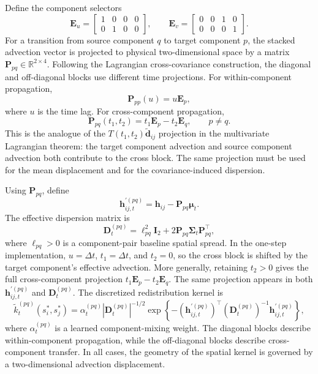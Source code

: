 Define the component selectors
\[
\mathbf E_u =
\begin{bmatrix}
1 & 0 & 0 & 0\\
0 & 1 & 0 & 0
\end{bmatrix},
\qquad
\mathbf E_v =
\begin{bmatrix}
0 & 0 & 1 & 0\\
0 & 0 & 0 & 1
\end{bmatrix}.
\]
For a transition from source component \(q\) to target component \(p\), the
stacked advection vector is projected to physical two-dimensional space by a
matrix \(\mathbf P_{pq}\in\mathbb R^{2\times4}\). Following the Lagrangian
cross-covariance construction, the diagonal and off-diagonal blocks use
different time projections. For within-component propagation,
\begin{equation}
\mathbf P_{pp}(u)=u\mathbf E_p,
\end{equation}
where \(u\) is the time lag. For cross-component propagation,
\begin{equation}
\mathbf P_{pq}(t_1,t_2)=t_1\mathbf E_p-t_2\mathbf E_q,
\qquad p\neq q .
\label{eq:component_cross_projection}
\end{equation}
This is the analogue of the \(T(t_1,t_2)\widetilde{\mathbf d}_{ij}\)
projection in the multivariate Lagrangian theorem: the target component
advection and source component advection both contribute to the cross block.
The same projection must be used for the mean displacement and for the
covariance-induced dispersion.

Using \(\mathbf P_{pq}\), define
\begin{equation}
\mathbf h_{ij,t}^{\prime(pq)}
=
\mathbf h_{ij}
-
\mathbf P_{pq}\boldsymbol\mu_t .
\label{eq:component_pairwise_hprime}
\end{equation}
The effective dispersion matrix is
\begin{equation}
\mathbf D_t^{(pq)}
=
\ell_{pq}^2\mathbf I_2
+
2\mathbf P_{pq}\boldsymbol\Sigma_t\mathbf P_{pq}^{\top},
\label{eq:component_effective_dispersion}
\end{equation}
where \(\ell_{pq}>0\) is a component-pair baseline spatial spread. In the
one-step implementation, \(u=\Delta t\), \(t_1=\Delta t\), and
\(t_2=0\), so the cross block is shifted by the target component's effective
advection. More generally, retaining \(t_2>0\) gives the full
cross-component projection \(t_1\mathbf E_p-t_2\mathbf E_q\). The same
projection appears in both \(\mathbf h_{ij,t}^{\prime(pq)}\) and
\(\mathbf D_t^{(pq)}\). The discretized redistribution kernel is
\begin{equation}
\widetilde{k}_t^{(pq)}(s_i^\ast,s_j^\ast)
=
\alpha_t^{(pq)}
\left|\mathbf D_t^{(pq)}\right|^{-1/2}
\exp
\left\{
-
\left(\mathbf h_{ij,t}^{\prime(pq)}\right)^\top
\left(\mathbf D_t^{(pq)}\right)^{-1}
\mathbf h_{ij,t}^{\prime(pq)}
\right\},
\label{eq:component_pairwise_kernel}
\end{equation}
where \(\alpha_t^{(pq)}\) is a learned component-mixing weight. The diagonal
blocks describe within-component propagation, while the off-diagonal blocks
describe cross-component transfer. In all cases, the geometry of the spatial
kernel is governed by a two-dimensional advection displacement.

